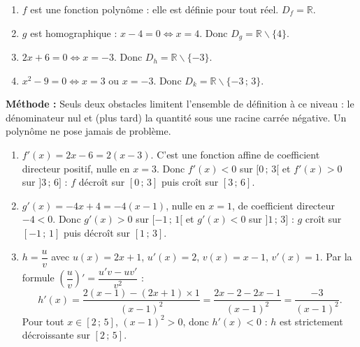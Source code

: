 \documentclass[11pt]{article}
\def\setminus{\mathbin{\backslash}}\let\smallsetminus\setminus
\begin{document}
\begin{corrige}
\begin{enumerate}
\item $f$ est une fonction polynôme : elle est définie pour tout réel. $D_{f}=\mathbb{R}$.
\item $g$ est homographique : $x-4=0\Leftrightarrow x=4$. Donc $D_{g}=\mathbb{R}\setminus\{4\}$.
\item $2x+6=0\Leftrightarrow x=-3$. Donc $D_{h}=\mathbb{R}\setminus\{-3\}$.
\item $x^{2}-9=0\Leftrightarrow x=3$ ou $x=-3$. Donc $D_{k}=\mathbb{R}\setminus\{-3\,;\,3\}$.
\end{enumerate}
\textbf{Méthode :} Seuls deux obstacles limitent l'ensemble de définition à ce niveau : le dénominateur nul et (plus tard) la quantité sous une racine carrée négative. Un polynôme ne pose jamais de problème.
\end{corrige}

\begin{corrige}
\begin{enumerate}
\item $f'(x)=2x-6=2(x-3)$. C'est une fonction affine de coefficient directeur positif, nulle en $x=3$. Donc $f'(x)<0$ sur $[0\,;\,3[$ et $f'(x)>0$ sur $]3\,;\,6]$ : $f$ décroît sur $[0\,;\,3]$ puis croît sur $[3\,;\,6]$.
\item $g'(x)=-4x+4=-4(x-1)$, nulle en $x=1$, de coefficient directeur $-4<0$. Donc $g'(x)>0$ sur $[-1\,;\,1[$ et $g'(x)<0$ sur $]1\,;\,3]$ : $g$ croît sur $[-1\,;\,1]$ puis décroît sur $[1\,;\,3]$.
\item $h=\dfrac{u}{v}$ avec $u(x)=2x+1$, $u'(x)=2$, $v(x)=x-1$, $v'(x)=1$. Par la formule $\left(\dfrac{u}{v}\right)'=\dfrac{u'v-uv'}{v^{2}}$ :
\[ h'(x)=\frac{2(x-1)-(2x+1)\times 1}{(x-1)^{2}}=\frac{2x-2-2x-1}{(x-1)^{2}}=\frac{-3}{(x-1)^{2}}. \]
Pour tout $x\in[2\,;\,5]$, $(x-1)^{2}>0$, donc $h'(x)<0$ : $h$ est strictement décroissante sur $[2\,;\,5]$.
\end{enumerate}
\end{corrige}
\end{document}
